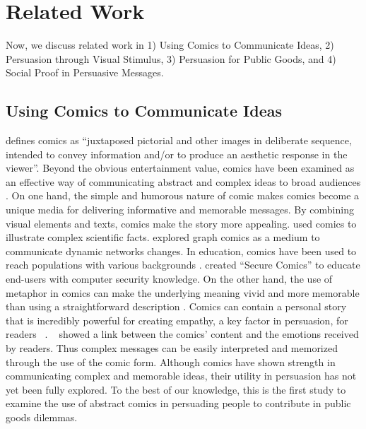 \section{Related Work}
\label{sec:relatedwork}
Now, we discuss related work in 1) Using Comics to Communicate Ideas, 2) Persuasion through Visual Stimulus, 3) Persuasion for Public Goods, and 4) Social Proof in Persuasive Messages.

\subsection{Using Comics to Communicate Ideas}
\textcite{scott1993understanding} defines comics as ``juxtaposed pictorial and other images in deliberate sequence, intended to convey information and/or to produce an aesthetic response in the viewer''. Beyond the obvious entertainment value, comics have been examined as an effective way of communicating abstract and complex ideas to broad audiences \cite{McDermottPB18,cary2004going,scott1993understanding, Zhang-Kennedy:2017:SCI:3206217.3206282}. On one hand, the simple and humorous nature of comic makes comics become a unique media for delivering informative and memorable messages. By combining visual elements and texts, comics make the story more appealing. \textcite{McDermottPB18} used comics to illustrate complex scientific facts. \textcite{Bach2016} explored graph comics as a medium to communicate dynamic networks changes. In education, comics have been used to reach populations with various backgrounds \cite{McDermottPB18,cary2004going,scott1993understanding}. \textcite{Zhang-Kennedy:2017:SCI:3206217.3206282} created ``Secure Comics'' to educate end-users with computer security knowledge. On the other hand, the use of metaphor in comics can make the underlying meaning vivid and more memorable than using a straightforward description \cite{McDermottPB18,scott1993understanding}. Comics can contain a personal story that is incredibly powerful for creating empathy, a key factor in persuasion, for readers ~\cite{weaver2017losing}. ~\textcite{matsubara2016emotional} showed a link between the comics' content and the emotions received by readers. Thus complex messages can be easily interpreted and memorized through the use of the comic form. Although comics have shown strength in communicating complex and memorable ideas, their utility in persuasion has not yet been fully explored. To the best of our knowledge, this is the first study to examine the use of abstract comics in persuading people to contribute in public goods dilemmas.  

